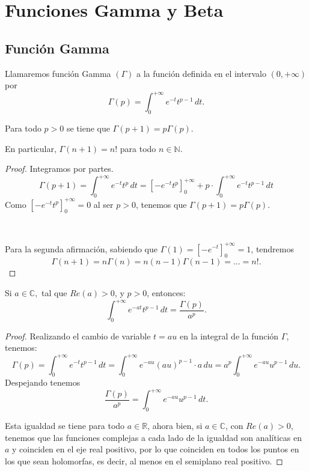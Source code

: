 \chapter{Funciones Gamma y Beta}
\label{ap:apendice1}
\justifying
\section{Función Gamma}
\begin{definition}
    Llamaremos función Gamma $(\Gamma)$ \index{$(\Gamma)$ }a la
    función definida en el intervalo $(0,+\infty)$ por
    \begin{equation}
        \Gamma(p)=\int_{0}^{+\infty}e^{-t}t^{p-1}\,dt.
    \end{equation}
\end{definition}


\begin{theorem}
    Para todo $p>0$ se tiene que $\Gamma(p+1)=p\Gamma(p)$.
    
    En particular, $\Gamma(n+1)=n!$ para todo $n\in\mathbb{N}$.
\end{theorem}

\begin{proof}
    Integramos por partes.
    \[
        \Gamma(p+1)=\int_{0}^{+\infty}e^{-t}t^{p}\,dt
        =\left[-e^{-t}t^{p}\right]_{0}^{+\infty}
        +p\cdot\int_{0}^{+\infty}e^{-t}t^{p-1}\,dt
    \]
    Como $\left[-e^{-t}t^{p}\right]_{0}^{+\infty}=0$ al ser
    $p > 0$, tenemos que $\Gamma(p+1) = p\Gamma(p)$.

    \

    Para la segunda afirmación, sabiendo que $\Gamma(1) = \left[
    -e^{-t}\right]_0^{+\infty}=1$, tendremos
    \[
        \Gamma(n+1)=n\Gamma(n)=n(n-1)\Gamma(n-1)=\dots=n!.
    \]   
\end{proof}

\begin{theorem}
    \label{thm:gamma}
    Si $a\in\mathbb{C},$ tal que $Re(a)>0$, y $p>0$, entonces:
    \[
        \int_{0}^{+\infty}e^{-at}t^{p-1}\,dt=\frac{\Gamma(p)}{a^{p}}.
    \]
\end{theorem}

\begin{proof}
    Realizando el cambio de variable $t = au$ en la integral
    de la función $\Gamma$, tenemos:
    \[
        \Gamma(p)=\int_{0}^{+\infty}e^{-t}t^{p-1}\,dt=
        \int_{0}^{+\infty}e^{-au}(au)^{p-1}\cdot a\,du=
        a^{p}\int_{0}^{+\infty}e^{-au}u^{p-1}\,du.
    \]
    Despejando tenemos
    \[
        \frac{\Gamma(p)}{a^{p}}=\int_{0}^{+\infty}e^{-au}u^{p-1}\,dt.
    \]

    Esta igualdad se tiene para todo $a\in\mathbb{R}$, ahora bien, si
    $a\in\mathbb{C}$, con $Re(a)>0$, tenemos que las funciones
    complejas a cada lado de la igualdad son analíticas en $a$
    y coinciden en el eje real positivo, por lo que coinciden en todos
    los puntos en los que sean holomorfas, es decir, al menos en el
    semiplano real positivo.
\end{proof}

